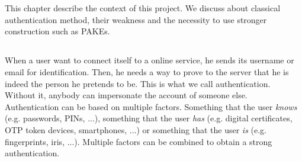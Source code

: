 \documentclass[../report.tex]{subfiles}
\begin{document}


\chapter{}

This chapter describe the context of this project. We discuss about classical authentication method, their weakness and the necessity to use stronger construction such as PAKEs.







\section{}

\paragraph{}

When a user want to connect itself to a online service, he sends its username or email for identification. Then, he needs a way to prove to the server that he is indeed the person he pretends to be. This is what we call authentication. Without it, anybody can impersonate the account of someone else.
Authentication can be based on multiple factors. Something that the user \emph{knows} (e.g. passwords, PINs, ...), something that the user \emph{has} (e.g. digital certificates, OTP token devices, smartphones, ...) or something that the user \emph{is} (e.g. fingerprints, iris, ...). Multiple factors can be combined to obtain a strong authentication.
\end{document}
